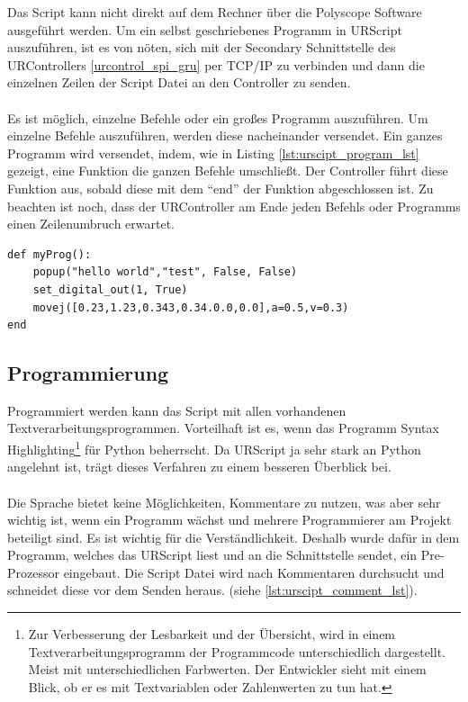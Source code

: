 Das Script kann nicht direkt auf dem Rechner über die Polyscope Software ausgeführt werden. Um ein selbst geschriebenes Programm in URScript auszuführen, ist es von nöten, sich mit der Secondary Schnittstelle des URControllers \ref{urcontrol_spi_gru} per \ac{TCP/IP} zu verbinden und dann die einzelnen Zeilen der Script Datei an den Controller zu senden.
\\\\
Es ist möglich, einzelne Befehle oder ein großes Programm auszuführen. Um einzelne Befehle auszuführen, werden diese nacheinander versendet.
Ein ganzes Programm wird versendet, indem, wie in Listing \ref{lst:urscipt_program_lst} gezeigt, eine Funktion die ganzen Befehle umschließt. Der Controller führt diese Funktion aus, sobald diese mit dem ``end'' der Funktion abgeschlossen ist.
Zu beachten ist noch, dass der URController am Ende jeden Befehls oder Programms einen Zeilenumbruch erwartet.

\begin{lstlisting}[caption={Kleines Beispielprogramm in URScript}, label=lst:urscipt_program_lst ,captionpos=b] 
def myProg():
	popup("hello world","test", False, False)
	set_digital_out(1, True)
	movej([0.23,1.23,0.343,0.34.0.0,0.0],a=0.5,v=0.3)
end
\end{lstlisting}

\subsection{Programmierung}
\label{programmierung_ur_script_rel}

Programmiert werden kann das Script mit allen vorhandenen Textverarbeitungsprogrammen. Vorteilhaft ist es, wenn das Programm Syntax Highlighting\footnote{Zur Verbesserung der Lesbarkeit und der Übersicht, wird in einem Textverarbeitungsprogramm der Programmcode unterschiedlich dargestellt. Meist mit unterschiedlichen Farbwerten. Der Entwickler sieht mit einem Blick, ob er es mit Textvariablen oder Zahlenwerten zu tun hat.} für Python beherrscht. Da URScript ja sehr stark an Python angelehnt ist, trägt dieses Verfahren zu einem besseren Überblick bei.
\\\\
Die Sprache bietet keine Möglichkeiten, Kommentare zu nutzen, was aber sehr wichtig ist, wenn ein Programm wächst und mehrere Programmierer am Projekt beteiligt sind. Es ist wichtig für die Verständlichkeit. Deshalb wurde dafür in dem Programm, welches das URScript liest und an die Schnittstelle sendet, ein Pre-Prozessor eingebaut. Die Script Datei wird nach Kommentaren durchsucht und schneidet diese vor dem Senden heraus. (siehe \ref{lst:urscipt_comment_lst}).

